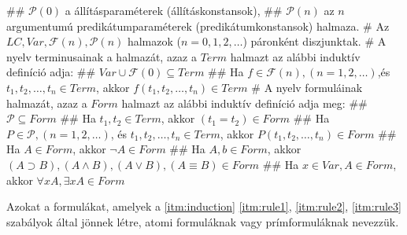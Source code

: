 \begin{definition}
\begin{easylist}
	## $\mathcal{P}(0)$ a állításparaméterek (állításkonstansok),
	## $\mathcal{P}(n)$ az $ n $ argumentumú predikátumparaméterek (predikátumkonstansok) halmaza.
	# Az $LC,Var,\mathcal{F}(n),\mathcal{P}(n)$ halmazok ($n = 0,1,2,\dots$) páronként diszjunktak.
	# A nyelv terminusainak a halmazát, azaz a $Term$ halmazt az alábbi induktív definíció adja:
	## $Var \cup \mathcal{F}(0)\subseteq Term$
	## Ha $f\in\mathcal{F}(n), (n=1,2,\dots)$,és $t_1,t_2,\dots,t_n \in Term$, akkor $f(t_1,t_2,\dots,t_n)\in Term$
	# \label{itm:induction}A nyelv formuláinak halmazát, azaz a $Form$ halmazt az alábbi induktív definíció adja meg:
	## \label{itm:rule1} $\mathcal{P}\subseteq Form$
	## \label{itm:rule2} Ha $t_1,t_2 \in Term$, akkor $(t_1 = t_2) \in Form$
	## \label{itm:rule3} Ha $P \in \mathcal{P}, (n=1,2,\dots)$, és $t_1,t_2,\dots,t_n\in Term$, akkor $P(t_1,t_2,\dots,t_n)\in Form$
	## Ha $A \in Form$, akkor $\neg A \in Form$
	## Ha $A,b \in Form$, akkor $(A \supset B),(A \land B),(A\lor B),(A\equiv B) \in Form$
	## Ha $x\in Var, A\in Form$, akkor $\forall x A, \exists x A \in Form$
	\end{easylist}
\end{definition}
\begin{note}
	Azokat a formulákat, amelyek a \ref{itm:induction} \ref{itm:rule1}, \ref{itm:rule2}, \ref{itm:rule3} szabályok által jönnek létre, atomi formuláknak vagy prímformuláknak nevezzük.
\end{note}

